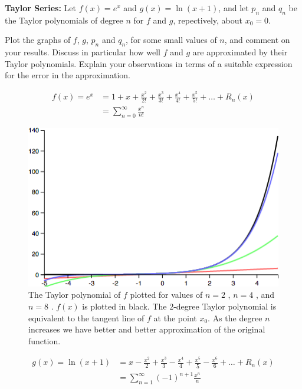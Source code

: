 \textbf{Taylor Series:} Let $f(x) = e^x$ and $g(x) = \ln(x + 1)$, and let $p_n$ and $q_n$ be the Taylor polynomials of degree $n$ for $f$ and $g$, repectively, about $x_0 = 0$.

Plot the graphs of $f$, $g$, $p_n$ and $q_n$, for some small values of $n$, and comment on your results. Discuss in particular how well $f$ and $g$ are approximated by their Taylor polynomials. Explain your observations in terms of a suitable expression for the error in the approximation.

{\color{blue}

\[
\begin{aligned}
f(x) = e^x &= 1 + x + \frac{x^2}{2!} + \frac{x^3}{3!} + \frac{x^4}{4!} + \frac{x^5}{5!} + \dots + R_n\left(x\right) \\
&= \sum_{n=0}^\infty \frac{x^n}{n!}
\end{aligned}
\]

\begin{figure}[H]
\centering
\includegraphics[scale=0.65]{taylor-series-f.png}
\caption{The Taylor polynomial of $f$ plotted for values of $n = 2$ , $n = 4$ , and $n = 8$ . $f(x)$ is plotted in black. The $2$-degree Taylor polynomial is equivalent to the tangent line of $f$ at the point $x_0$. As the degree $n$ increases we have better and better approximation of the original function.}
\end{figure}

\[
\begin{aligned}
g(x) = \ln(x+1) &= x - \frac{x^2}{2} + \frac{x^3}{3} - \frac{x^4}{4} + \frac{x^5}{5} - \frac{x^6}{6} + \dots + R_n\left(x\right) \\
&= \sum_{n=1}^\infty (-1)^{n+1} \frac{x^n}{n}
\end{aligned}
\]

}
